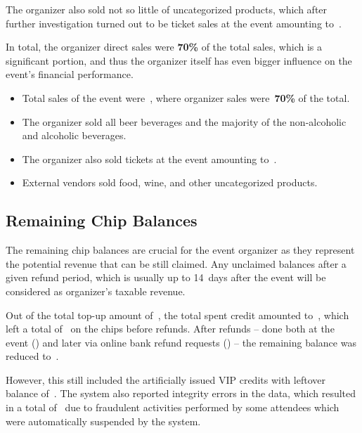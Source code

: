 The organizer also sold not so little of uncategorized products, which after further investigation turned out to be ticket sales at the event amounting to~.

In total, the organizer direct sales were \textbf{70\%} of the total sales, which is a significant portion, and thus the organizer itself has even bigger influence on the event's financial performance.

\begin{keytakeaways}
	\begin{itemize}
		\item Total sales of the event were~, where organizer sales were~\textbf{70\%} of the total.
		\item The organizer sold all beer beverages and the majority of the non-alcoholic and alcoholic beverages.
		\item The organizer also sold tickets at the event amounting to~.
		\item External vendors sold food, wine, and other uncategorized products.
	\end{itemize}
\end{keytakeaways}



\subsection{Remaining Chip Balances}
\label{subsec:analysis-remaining-balances}

The remaining chip balances are crucial for the event organizer as they represent the potential revenue that can be still claimed.
Any unclaimed balances after a given refund period, which is usually up to 14~days after the event will be considered as organizer's taxable revenue.

Out of the total top-up amount of~, the total spent credit amounted to~, which left a total of~ on the chips before refunds.
After refunds – done both at the event () and later via online bank refund requests () – the remaining balance was reduced to~.

However, this still included the artificially issued VIP credits with leftover balance of~.
The system also reported integrity errors in the data, which resulted in a total of~ due to fraudulent activities performed by some attendees which were automatically suspended by the system.


